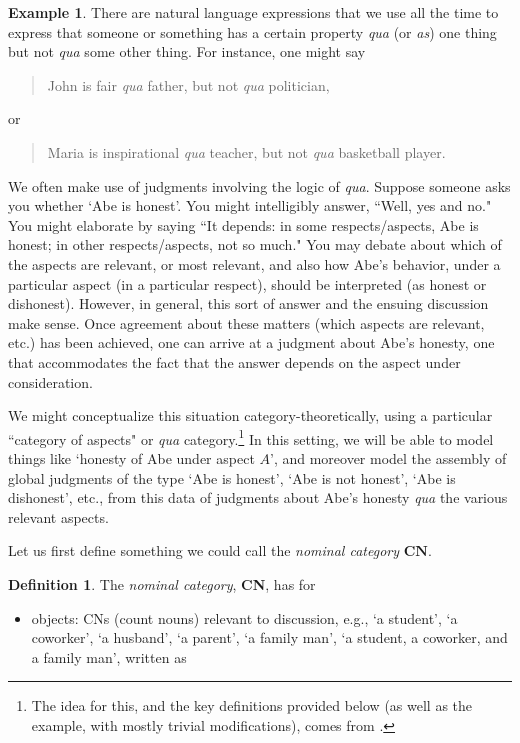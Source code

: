 \documentclass[a4paper]{book}
\theoremstyle{definition}
\newtheorem{example}{Example}[section]
\theoremstyle{definition}
\newtheorem{definition}{Definition}[section]
\theoremstyle{definition}
\theoremstyle{theorem}
\theoremstyle{definition}
\begin{document}
\begin{example} \label{qua}
	There are natural language expressions that we use all the time to express that someone or something has a certain property \textit{qua} (or \textit{as}) one thing but not \textit{qua} some other thing. For instance, one might say  
	\begin{quote}
		John is fair \textit{qua} father, but not \textit{qua} politician,  
	\end{quote}
or 
\begin{quote}
	Maria is inspirational \textit{qua} teacher, but not \textit{qua} basketball player.
\end{quote}
We often make use of judgments involving the logic of \textit{qua}. Suppose someone asks you whether `Abe is honest'. You might intelligibly answer, ``Well, yes and no." You might elaborate by saying ``It depends: in some respects/aspects, Abe is honest; in other respects/aspects, not so much." You may debate about which of the aspects are relevant, or most relevant, and also how Abe's behavior, under a particular aspect (in a particular respect), should be interpreted (as honest or dishonest). However, in general, this sort of answer and the ensuing discussion make sense. Once agreement about these matters (which aspects are relevant, etc.) has been achieved, one can arrive at a judgment about Abe's honesty, one that accommodates the fact that the answer depends on the aspect under consideration. \par 
	We might conceptualize this situation category-theoretically, using a particular  ``category of aspects" or \textit{qua} category.\footnote{The idea for this, and the key definitions provided below (as well as the example, with mostly trivial modifications), comes from \cite{la_palme_reyes_models_1999}.} In this setting, we will be able to model things like `honesty of Abe under aspect $A$', and moreover model the assembly of global judgments of the type `Abe is honest', `Abe is not honest', `Abe is dishonest', etc., from this data of judgments about Abe's honesty \textit{qua} the various relevant aspects. \par 
	Let us first define something we could call the \textit{nominal category} $\textbf{CN}$. 
	\begin{definition}
		The \textit{nominal category}, \textbf{CN}, has for
		\begin{itemize}
			\item objects: CNs (count nouns) relevant to discussion, e.g., `a student', `a coworker', `a husband', `a parent', `a family man', `a student, a coworker, and a family man', written as 

\end{itemize}
\end{definition}
\end{example}
\end{document}
